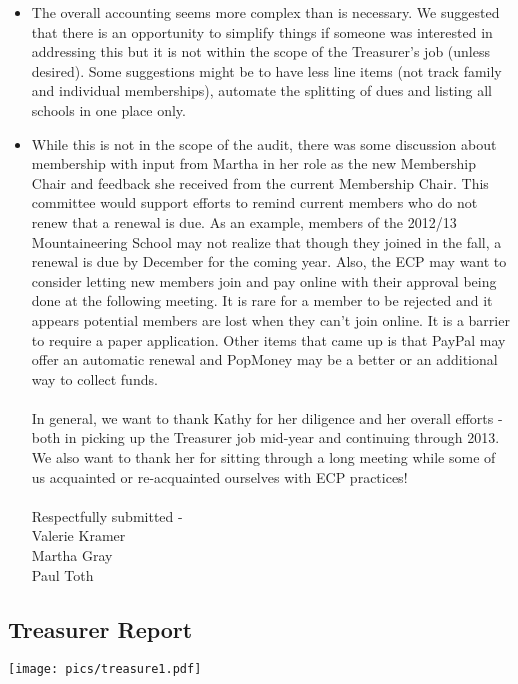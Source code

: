 \documentclass[10pt,a4paper]{article}
\newcommand\subsect[1]{%
  \subsection*{#1}%
  \addcontentsline{toc}{subsection}{#1}}
\newenvironment{Figure}
  {\par\medskip\noindent\minipage{\linewidth}}
  {\endminipage\par\medskip}
\begin{document}
\begin{multicols}{2}
\begin{itemize}
\item The overall accounting seems more complex than is necessary.   We suggested that there is an opportunity to simplify things if someone was interested in addressing this but it is not within the scope of the Treasurer's job (unless desired).  Some suggestions might be to have less line items (not track family and individual memberships), automate the splitting of dues and listing all schools in one place only.

\item While this is not in the scope of the audit, there was some discussion about membership with input from Martha in her role as the new Membership Chair and feedback she received from the current Membership Chair.  This committee would support efforts to remind current members who do not renew that a renewal is due. As an example, members of the 2012/13 Mountaineering School may not realize that though they joined in the fall, a renewal is due by December for the coming year.   Also, the ECP may want to consider letting new members join and pay online with their approval being done at the following meeting.  It is rare for a member to be rejected and it appears potential members are lost when they can't join online.  It is a barrier to require a paper application. Other items that came up is that PayPal may offer an automatic renewal and PopMoney may be a better or an additional way to collect funds.
\\
\\
In general, we want to thank Kathy for her diligence and her overall efforts - both in picking up the Treasurer job mid-year and continuing through 2013.  We also want to thank her for sitting through a long meeting while some of us acquainted or re-acquainted ourselves with ECP practices!
\\
\\
Respectfully submitted - \\
Valerie Kramer\\
Martha Gray\\
Paul Toth 
\end{itemize}


\end{multicols}
\clearpage
\pagebreak

\subsect{Treasurer Report}

\begin{Figure}
 \centering
 \texttt{[image: pics/treasure1.pdf]}
\end{Figure}
\end{document}
